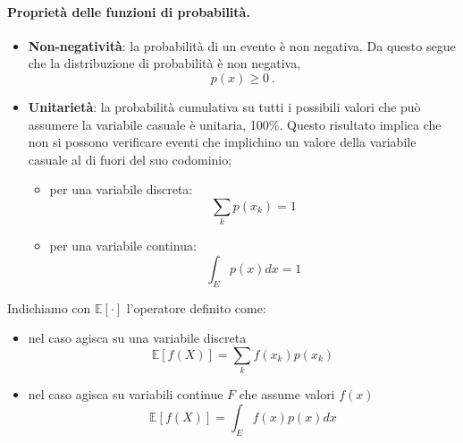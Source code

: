 \paragraph{Proprietà delle funzioni di probabilità.}
\begin{itemize}
    \item \textbf{Non-negatività}: la probabilità di un evento è non negativa. Da questo segue che la distribuzione di probabilità è non negativa,
        \begin{equation}
            p(x) \ge 0 \ .
        \end{equation}
    \item \textbf{Unitarietà}: la probabilità cumulativa su tutti i possibili valori che può assumere la variabile casuale è unitaria, 100\%. Questo risultato implica che non si possono verificare eventi che implichino un valore della variabile casuale al di fuori del suo codominio;
        \begin{itemize}
            \item per una variabile discreta:
                \begin{equation}
                    \sum_{k} p(x_k) = 1
                \end{equation}
            \item per una variabile continua:
                \begin{equation}
                    \int_E p(x) dx = 1
                \end{equation}
        \end{itemize}
\end{itemize}
\begin{notation}[] Indichiamo con $\mathbb{E}[\cdot]$ l'operatore definito come:
    \begin{itemize}
        \item nel caso agisca su una variabile discreta 
            \begin{equation}
                \mathbb{E}[f(X)] = \sum_k f(x_k) p(x_k)
            \end{equation}
        \item nel caso agisca su variabili continue $F$ che assume valori $f(x)$
            \begin{equation}
                \mathbb{E}[f(X)] = \int_E f(x) p(x) dx
            \end{equation}
    \end{itemize}
\end{notation}
